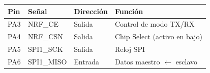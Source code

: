 \documentclass[12pt,a4paper]{article}
\begin{document}
  \begin{table}[h]                                                                                                                                                                                                                                            
  \centering                                                                                                                                                                                                                                                  
  \begin{tabular}{llll}                                                                                                                                                                                                                                       
  \hline                                                                                                                                                                                                                                                      
  \textbf{Pin} & \textbf{Señal} & \textbf{Dirección} & \textbf{Función} \\                                                                                                                                                                                    
  \hline                                                                                                                                                                                                                                                      
  PA3 & NRF\_CE    & Salida & Control de modo TX/RX \\                                                                                                                                                                                                        
  PA4 & NRF\_CSN   & Salida & Chip Select (activo en bajo) \\                                                                                                                                                                                                 
  PA5 & SPI1\_SCK  & Salida & Reloj SPI \\                                                                                                                                                                                                                    
  PA6 & SPI1\_MISO & Entrada & Datos maestro $\leftarrow$ esclavo \\                                                                                                                                                                                          

\end{tabular}
\end{table}
\end{document}
